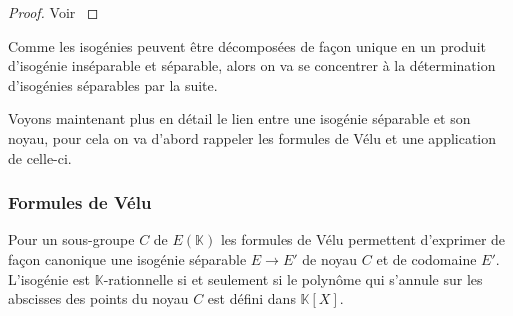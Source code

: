 \documentclass[10pt,a4paper]{book}
\theoremstyle{plain}
\theoremstyle{definition}
\theoremstyle{definition}
\theoremstyle{definition}
\theoremstyle{definition}
\theoremstyle{remark}
\theoremstyle{remark}
\begin{document}
\begin{proof}
Voir \cite[III.4.10]{Silv1}
\end{proof}

Comme les isogénies peuvent être décomposées de façon unique en un produit d'isogénie inséparable et séparable, alors on va se concentrer à la détermination d'isogénies séparables par la suite.

Voyons maintenant plus en détail le lien entre une isogénie séparable et son noyau, pour cela on va d'abord rappeler les formules de Vélu et une application de celle-ci.

\subsubsection{Formules de Vélu}
\label{sse:Vel}
Pour un sous-groupe $C$ de $E(\mathbb{K})$ les formules de Vélu \cite{velu1971} permettent d'exprimer de façon canonique une isogénie séparable $E \rightarrow E'$ de noyau $C$ et de codomaine $E'$.  L'isogénie est $\mathbb{K}$-rationnelle si et seulement si le polynôme qui s'annule sur les abscisses des points du noyau $C$ est défini dans $\mathbb{K}[X]$.
\end{document}
